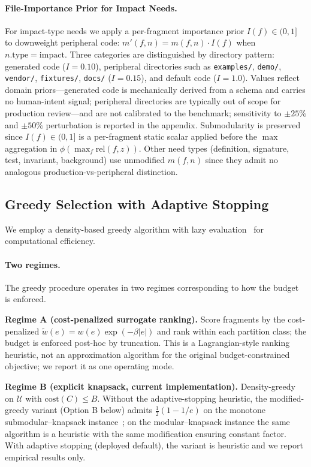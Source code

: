 \documentclass[11pt, a4paper]{article}
\begin{document}
\paragraph{File-Importance Prior for Impact Needs.}
\label{sec:importance}
For impact-type needs we apply a per-fragment importance prior $I(f) \in (0, 1]$ to downweight peripheral code: $m'(f, n) = m(f, n) \cdot I(f)$ when $n.\mathrm{type} = \mathrm{impact}$. Three categories are distinguished by directory pattern: generated code ($I = 0.10$), peripheral directories such as \texttt{examples/}, \texttt{demo/}, \texttt{vendor/}, \texttt{fixtures/}, \texttt{docs/} ($I = 0.15$), and default code ($I = 1.0$). Values reflect domain priors---generated code is mechanically derived from a schema and carries no human-intent signal; peripheral directories are typically out of scope for production review---and are not calibrated to the benchmark; sensitivity to $\pm 25\%$ and $\pm 50\%$ perturbation is reported in the appendix. Submodularity is preserved since $I(f) \in (0, 1]$ is a per-fragment static scalar applied before the $\max$ aggregation in $\phi(\max_f \mathrm{rel}(f, z))$. Other need types (definition, signature, test, invariant, background) use unmodified $m(f, n)$ since they admit no analogous production-vs-peripheral distinction.

\subsection{Greedy Selection with Adaptive Stopping}
\label{sec:greedy}

We employ a density-based greedy algorithm with lazy evaluation~\cite{minoux1978accelerated} for computational efficiency.

\paragraph{Two regimes.} The greedy procedure operates in two regimes corresponding to how the budget is enforced.

\textbf{Regime A (cost-penalized surrogate ranking).} Score fragments by the cost-penalized $\tilde{w}(e) = w(e) \exp(-\beta |e|)$ and rank within each partition class; the budget is enforced post-hoc by truncation. This is a Lagrangian-style ranking heuristic, not an approximation algorithm for the original budget-constrained objective; we report it as one operating mode.

\textbf{Regime B (explicit knapsack, current implementation).} Density-greedy on $\mathcal{U}$ with $\mathrm{cost}(C) \leq B$. Without the adaptive-stopping heuristic, the modified-greedy variant (Option B below) admits $\frac{1}{2}(1-1/e)$ on the monotone submodular--knapsack instance~\cite{khuller1999budgeted, sviridenko2004note}; on the modular--knapsack instance the same algorithm is a heuristic with the same modification ensuring constant factor. With adaptive stopping (deployed default), the variant is heuristic and we report empirical results only.
\end{document}
